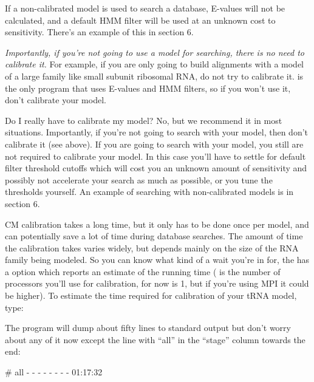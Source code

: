If a non-calibrated model is used to search a database, E-values will not
be calculated, and a default HMM filter will be used at an unknown
cost to sensitivity. There's an example of this in section 6. 

\emph{Importantly, if you're not going to use a model for searching, there
is no need to calibrate it.} For example, if you are only going to
build alignments with a model of a large family like small subunit
ribosomal RNA, do not try to calibrate it.  is the only
 program that uses E-values and HMM filters, so if
you won't use it, don't calibrate your model.

\begin{srefaq}{Do I really have to calibrate my model?} No, but we
  recommend it in most situations. Importantly, if you're not going to
  search with your model, then don't calibrate it (see above). If you
  are going to search with your model, you still are not required to
  calibrate your model. In this case you'll have to settle for default
  filter threshold cutoffs which will cost you an unknown amount of
  sensitivity and possibly not accelerate your search as much as
  possible, or you tune the thresholds yourself. An example of
  searching with non-calibrated models is in section 6.
\end{srefaq}

CM calibration takes a long time, but it only has
to be done once per model, and can potentially save a lot of time
during database searches. The amount of time the calibration takes
varies widely, but depends mainly on the size of the RNA family being
modeled. 
So you can know what kind of a wait you're in for, the
 has a  option which reports an
estimate of the running time ( is the number of processors
you'll use for calibration, for now 
is 1, but if you're using MPI it could be higher). To estimate the
time required for calibration of your tRNA
model, type:


The program will dump about fifty lines to standard output but 
don't worry about any of it now except the line with ``all'' in the
``stage'' column towards the end:

\begin{sreoutput}
  # all         -    -    -     -   -   -         -      -       01:17:32
\end{sreoutput}

